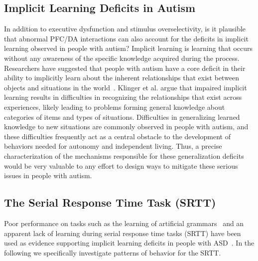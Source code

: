 %
%

\subsection{Implicit Learning Deficits in Autism}


In addition to executive dysfunction and stimulus overselectivity, is it plausible that abnormal PFC/DA interactions can also account for the deficits in implicit learning observed in people with autism?  Implicit learning is learning that occurs without any awareness of the specific knowledge acquired during the process.  Researchers have suggested that people with autism have a core deficit in their ability to implicitly learn about the inherent relationships that exist between objects and situations in the world~\cite{RefWorks:148,RefWorks:149}.  Klinger et al. argue that impaired implicit learning results in difficulties in recognizing the relationships that exist across experiences, likely leading to problems forming general knowledge about categories of items and types of situations.  Difficulties in generalizing learned knowledge to new situations are commonly observed in people with autism, and these difficulties frequently act as a central obstacle to the development of behaviors needed for autonomy and independent living.  Thus, a precise characterization of the mechanisms responsible for these generalization deficits would be very valuable to any effort to design ways to mitigate these serious issues in people with autism.

\subsection{The Serial Response Time Task (SRTT)}
Poor performance on tasks such as the learning of artificial grammars~\cite{RefWorks:147} and an apparent lack of learning during serial response time tasks (SRTT) have been used as evidence supporting implicit learning deficits in people with ASD~\cite{RefWorks:148,RefWorks:149}.  In the following we specifically investigate patterns of behavior for the SRTT.

